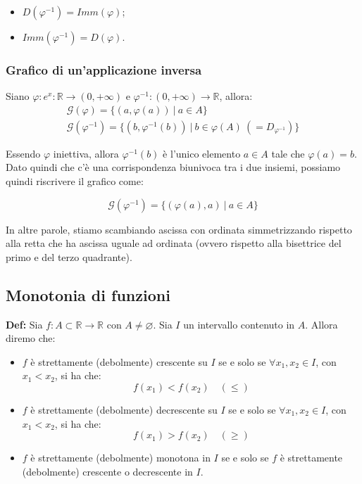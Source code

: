 \documentclass{article}
\begin{document}
\begin{itemize}
    \item $D(\varphi^{-1}) = Imm(\varphi)$;
    \item $Imm(\varphi^{-1}) = D(\varphi)$.
\end{itemize}

\subsubsection{Grafico di un'applicazione inversa}
Siano $\varphi: e^x: \mathbb{R} \xrightarrow{} (0, + \infty)$ e $\varphi^{-1}: (0, + \infty) \xrightarrow{} \mathbb{R}$, allora:
\begin{gather*}
    \mathcal{G}(\varphi) = \{(a, \varphi(a)) \ | \ a \in A\}\\
    \mathcal{G}(\varphi^{-1}) = \{(b, \varphi^{-1}(b)) \ | \ b \in \varphi(A) \ (= D_{\varphi^{-1}})\} 
\end{gather*}

\noindent Essendo $\varphi$ iniettiva, allora $\varphi^{-1}(b)$ è l'unico elemento $a \in A$ tale che $\varphi(a) = b$. Dato quindi che c'è una corrispondenza biunivoca tra i due insiemi, possiamo quindi riscrivere il grafico come: 

\begin{equation*}
    \mathcal{G}(\varphi^{-1}) = \{(\varphi(a), a) \ | \ a \in A\}
\end{equation*}

\noindent In altre parole, stiamo scambiando ascissa con ordinata simmetrizzando rispetto alla retta che ha ascissa uguale ad ordinata (ovvero rispetto alla bisettrice del primo e del terzo quadrante).

\subsection{Monotonia di funzioni}
\textbf{Def:} Sia $f: A \subset \mathbb{R} \xrightarrow{} \mathbb{R}$ con $A \neq \varnothing$. Sia $I$ un intervallo contenuto in $A$. Allora diremo che:

\begin{itemize}
    \item $f$ è strettamente (debolmente) crescente su $I$ se e solo se $\forall x_1, x_2 \in I$, con $x_1 < x_2$, si ha che: $$f(x_1) < f(x_2) \quad (\leq)$$
    \item $f$ è strettamente (debolmente) decrescente su $I$ se e solo se $\forall x_1, x_2 \in I$, con $x_1 < x_2$, si ha che: $$f(x_1) > f(x_2) \quad (\geq)$$
    \item $f$ è strettamente (debolmente) monotona in $I$ se e solo se $f$ è strettamente (debolmente) crescente o decrescente in $I$.
\end{itemize}
\end{document}
